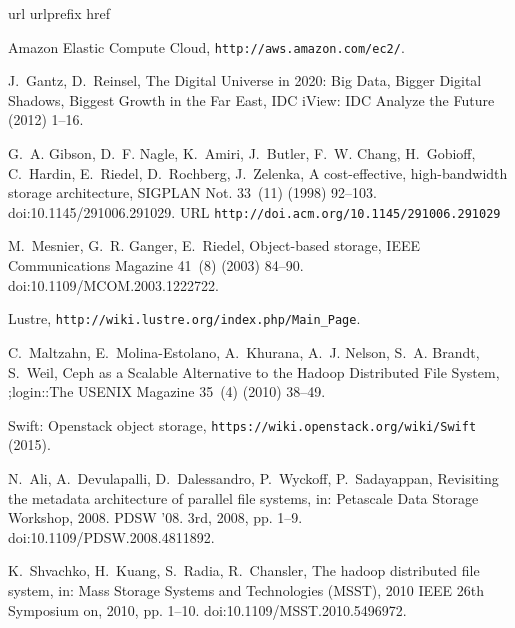 \documentclass[preprint,12pt]{elsarticle}
\begin{document}
\begin{thebibliography}{10}
\expandafter\ifx\csname url\endcsname\relax
  \def\url#1{\texttt{#1}}\fi
\expandafter\ifx\csname urlprefix\endcsname\relax\def\urlprefix{URL }\fi
\expandafter\ifx\csname href\endcsname\relax
  \def\href#1#2{#2} \def\path#1{#1}\fi

{Amazon Elastic Compute Cloud}, \url{http://aws.amazon.com/ec2/}.

J.~Gantz, D.~Reinsel, {The Digital Universe in 2020: Big Data, Bigger Digital
  Shadows, Biggest Growth in the Far East}, IDC iView: IDC Analyze the Future
  (2012) 1--16.

G.~A. Gibson, D.~F. Nagle, K.~Amiri, J.~Butler, F.~W. Chang, H.~Gobioff,
  C.~Hardin, E.~Riedel, D.~Rochberg, J.~Zelenka,
  \href{http://doi.acm.org/10.1145/291006.291029}{A cost-effective,
  high-bandwidth storage architecture}, SIGPLAN Not. 33~(11) (1998) 92--103.
\newblock \href {http://dx.doi.org/10.1145/291006.291029}
  {\path{doi:10.1145/291006.291029}}.
\newline\urlprefix\url{http://doi.acm.org/10.1145/291006.291029}

M.~Mesnier, G.~R. Ganger, E.~Riedel, Object-based storage, IEEE Communications
  Magazine 41~(8) (2003) 84--90.
\newblock \href {http://dx.doi.org/10.1109/MCOM.2003.1222722}
  {\path{doi:10.1109/MCOM.2003.1222722}}.

{Lustre}, \url{http://wiki.lustre.org/index.php/Main\_Page}.

C.~Maltzahn, E.~Molina-Estolano, A.~Khurana, A.~J. Nelson, S.~A. Brandt,
  S.~Weil, {Ceph as a Scalable Alternative to the Hadoop Distributed File
  System}, {;login::The USENIX Magazine} 35~(4) (2010) 38--49.

{Swift}: Openstack object storage, \url{https://wiki.openstack.org/wiki/Swift}
  (2015).

N.~Ali, A.~Devulapalli, D.~Dalessandro, P.~Wyckoff, P.~Sadayappan, Revisiting
  the metadata architecture of parallel file systems, in: Petascale Data
  Storage Workshop, 2008. PDSW '08. 3rd, 2008, pp. 1--9.
\newblock \href {http://dx.doi.org/10.1109/PDSW.2008.4811892}
  {\path{doi:10.1109/PDSW.2008.4811892}}.

K.~Shvachko, H.~Kuang, S.~Radia, R.~Chansler, The hadoop distributed file
  system, in: Mass Storage Systems and Technologies (MSST), 2010 IEEE 26th
  Symposium on, 2010, pp. 1--10.
\newblock \href {http://dx.doi.org/10.1109/MSST.2010.5496972}
  {\path{doi:10.1109/MSST.2010.5496972}}.


\end{thebibliography}
\end{document}
